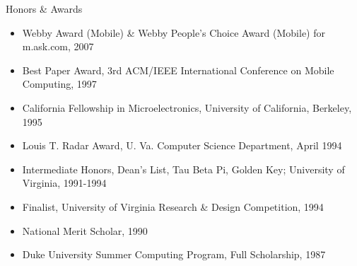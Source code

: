 \begin{bf} \large
Honors \& Awards  \\[-16pt]
\end{bf}

\begin{itemize}
\item Webby Award (Mobile) \& Webby People's Choice Award (Mobile)
	 for m.ask.com, 2007 \\[-18pt]
\item  Best Paper Award, 3rd ACM/IEEE International Conference on Mobile Computing, 1997 \\[-18pt]
\item  California Fellowship in Microelectronics,
        University of California, Berkeley, 1995  \\[-18pt]
\item  Louis T. Radar Award, U. Va. Computer Science Department, April 1994 \\[-18pt]
\item  Intermediate Honors, Dean's List, Tau Beta Pi, Golden Key; 
 University of Virginia, 1991-1994 \\[-18pt]
\item  Finalist, University of Virginia Research \& Design Competition, 1994 \\[-18pt]
\item  National Merit Scholar, 1990 \\[-18pt]
\item    Duke University Summer Computing Program, Full Scholarship, 1987 \\
\end{itemize}



